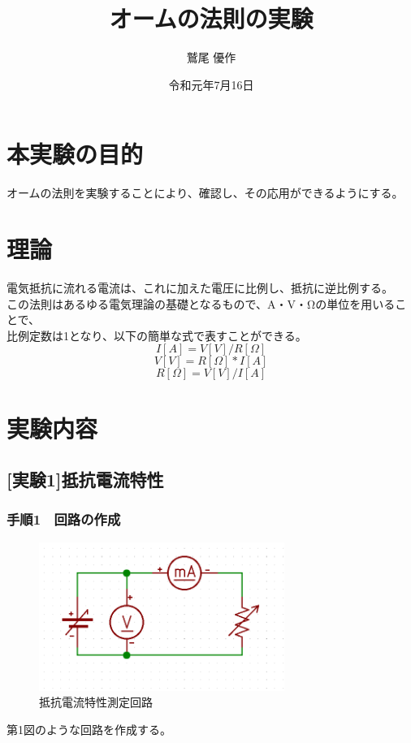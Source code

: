 \documentclass[titlepage]{jarticle}
\title{オームの法則の実験}
\author{鷲尾 優作}
\date{令和元年7月16日}
\begin{document}
\maketitle

\section{本実験の目的}
オームの法則を実験することにより、確認し、その応用ができるようにする。

\section{理論}
電気抵抗に流れる電流は、これに加えた電圧に比例し、抵抗に逆比例する。\\
この法則はあるゆる電気理論の基礎となるもので、A・V・Ωの単位を用いることで、\\
比例定数は1となり、以下の簡単な式で表すことができる。
\begin{equation}
    I[A]=V[V]/R[Ω]
\end{equation}
\begin{equation}
    V[V]=R[Ω]*I[A]
\end{equation}
\begin{equation}
    R[Ω]=V[V]/I[A]
\end{equation}

\section{実験内容}
\subsection{[実験1]抵抗電流特性}
\subsubsection{手順1　回路の作成}
\begin{figure}[H]
    \begin{center}
        \includegraphics[width=8cm]{04.png}
        \caption{抵抗電流特性測定回路}
    \end{center}
\end{figure}
第1図のような回路を作成する。
\end{document}
